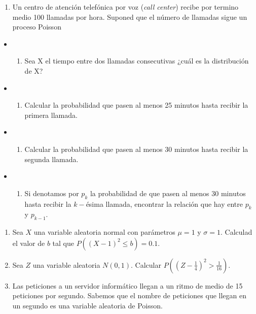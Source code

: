 \documentclass[
]{article}
\providecommand{\tightlist}{%
  \setlength{\itemsep}{0pt}\setlength{\parskip}{0pt}}
\begin{document}
\begin{enumerate}
\def\labelenumi{\arabic{enumi}.}
\setcounter{enumi}{3}
\tightlist
\item
  Un centro de atención telefónica por voz (\emph{call center}) recibe
  por termino medio 100 llamadas por hora. Suponed que el número de
  llamadas sigue un proceso Poisson
\end{enumerate}

\begin{itemize}
\item
  \begin{enumerate}
  \def\labelenumi{\alph{enumi})}
  \tightlist
  \item
    Sea X el tiempo entre dos llamadas consecutivas ¿cuál es la
    distribución de X?
  \end{enumerate}
\item
  \begin{enumerate}
  \def\labelenumi{\alph{enumi})}
  \setcounter{enumi}{1}
  \tightlist
  \item
    Calcular la probabilidad que pasen al menos 25 minutos hasta recibir
    la primera llamada.
  \end{enumerate}
\item
  \begin{enumerate}
  \def\labelenumi{\alph{enumi})}
  \setcounter{enumi}{2}
  \tightlist
  \item
    Calcular la probabilidad que pasen al menos 30 minutos hasta recibir
    la segunda llamada.
  \end{enumerate}
\item
  \begin{enumerate}
  \def\labelenumi{\alph{enumi})}
  \setcounter{enumi}{3}
  \tightlist
  \item
    Si denotamos por \(p_k\) la probabilidad de que pasen al menos 30
    minutos hasta recibir la \(k-\)ésima llamada, encontrar la relación
    que hay entre \(p_k\) y \(p_{k-1}\).
  \end{enumerate}
\end{itemize}

\begin{enumerate}
\def\labelenumi{\arabic{enumi}.}
\setcounter{enumi}{4}
\item
  Sea \(X\) una variable aleatoria normal con parámetros \(\mu=1\) y
  \(\sigma=1\). Calculad el valor de \(b\) tal que
  \(P\left((X-1)^2\leq b\right)=0.1\).
\item
  Sea \(Z\) una variable aleatoria \(N(0,1)\). Calcular
  \(P\left(\left(Z-\frac{1}{4}\right)^2 >\frac{1}{16}\right)\).
\item
  Las peticiones a un servidor informático llegan a un ritmo de medio de
  15 peticiones por segundo. Sabemos que el nombre de peticiones que
  llegan en un segundo es una variable aleatoria de Poisson.
\end{enumerate}
\end{document}
